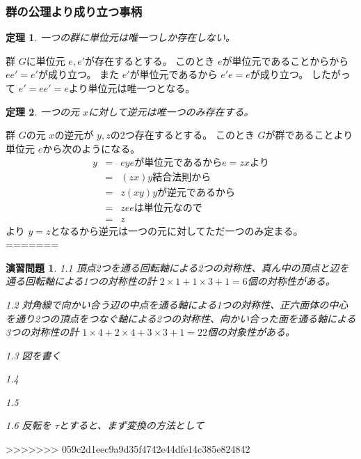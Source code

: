 \documentclass[dvipdfmx]{jsarticle}
\newtheorem{theo}{定理}
\newtheorem{plob}{演習問題}
\begin{document}
\subsubsection{群の公理より成り立つ事柄}
\begin{theo}
  一つの群に単位元は唯一つしか存在しない。
\end{theo}

群 $G$に単位元 $e,e'$が存在するとする。
このとき $e$が単位元であることからから $ee' = e'$が成り立つ。
また $e'$が単位元であるから $e'e = e$が成り立つ。
したがって $e' = ee' = e$より単位元は唯一つとなる。

\begin{theo}
  一つの元 $x$に対して逆元は唯一つのみ存在する。
\end{theo}

群 $G$の元 $x$の逆元が $y,z$の2つ存在するとする。
このとき $G$が群であることより単位元 $e$から次のようになる。
\begin{eqnarray*}
  y & = & ey　　　　eが単位元であるから e = zxより \\
    & = & (zx)y　　　結合法則から \\
    & = & z(xy)　　　yが逆元であるから \\
    & = & ze　　　　eは単位元なので \\
    & = & z
\end{eqnarray*}
より $y = z$となるから逆元は一つの元に対してただ一つのみ定まる。
=======
\begin{plob}

1.1 頂点2つを通る回転軸による2つの対称性、真ん中の頂点と辺を通る回転軸による1つの対称性の計 $2 \times 1 + 1 \times 3 + 1= 6$個の対称性がある。

1.2 対角線で向かい合う辺の中点を通る軸による1つの対称性、正六面体の中心を通り2つの頂点をつなぐ軸による2つの対称性、向かい合った面を通る軸による3つの対称性の計 $1 \times 4 + 2 \times 4 + 3 \times 3 + 1 = 22$個の対象性がある。

1.3 図を書く

1.4

1.5

1.6 反転を $\tau$とすると、まず変換の方法として
\end{plob}


>>>>>>> 059c2d1eec9a9d35f4742e44dfe14c385e824842
\end{document}
